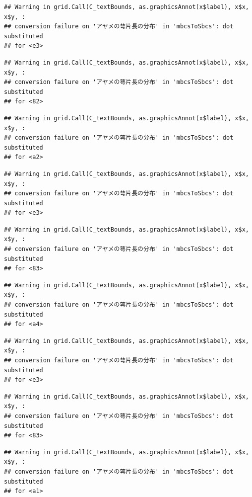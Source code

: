 \documentclass[
]{book}
\begin{document}
\begin{verbatim}
## Warning in grid.Call(C_textBounds, as.graphicsAnnot(x$label), x$x, x$y, :
## conversion failure on 'アヤメの萼片長の分布' in 'mbcsToSbcs': dot substituted
## for <e3>
\end{verbatim}

\begin{verbatim}
## Warning in grid.Call(C_textBounds, as.graphicsAnnot(x$label), x$x, x$y, :
## conversion failure on 'アヤメの萼片長の分布' in 'mbcsToSbcs': dot substituted
## for <82>
\end{verbatim}

\begin{verbatim}
## Warning in grid.Call(C_textBounds, as.graphicsAnnot(x$label), x$x, x$y, :
## conversion failure on 'アヤメの萼片長の分布' in 'mbcsToSbcs': dot substituted
## for <a2>
\end{verbatim}

\begin{verbatim}
## Warning in grid.Call(C_textBounds, as.graphicsAnnot(x$label), x$x, x$y, :
## conversion failure on 'アヤメの萼片長の分布' in 'mbcsToSbcs': dot substituted
## for <e3>
\end{verbatim}

\begin{verbatim}
## Warning in grid.Call(C_textBounds, as.graphicsAnnot(x$label), x$x, x$y, :
## conversion failure on 'アヤメの萼片長の分布' in 'mbcsToSbcs': dot substituted
## for <83>
\end{verbatim}

\begin{verbatim}
## Warning in grid.Call(C_textBounds, as.graphicsAnnot(x$label), x$x, x$y, :
## conversion failure on 'アヤメの萼片長の分布' in 'mbcsToSbcs': dot substituted
## for <a4>
\end{verbatim}

\begin{verbatim}
## Warning in grid.Call(C_textBounds, as.graphicsAnnot(x$label), x$x, x$y, :
## conversion failure on 'アヤメの萼片長の分布' in 'mbcsToSbcs': dot substituted
## for <e3>
\end{verbatim}

\begin{verbatim}
## Warning in grid.Call(C_textBounds, as.graphicsAnnot(x$label), x$x, x$y, :
## conversion failure on 'アヤメの萼片長の分布' in 'mbcsToSbcs': dot substituted
## for <83>
\end{verbatim}

\begin{verbatim}
## Warning in grid.Call(C_textBounds, as.graphicsAnnot(x$label), x$x, x$y, :
## conversion failure on 'アヤメの萼片長の分布' in 'mbcsToSbcs': dot substituted
## for <a1>
\end{verbatim}
\end{document}
